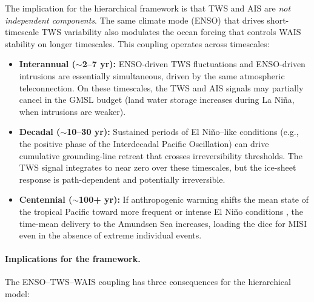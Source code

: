 \documentclass[11pt]{article}
\newcommand{\CDW}{\text{CDW}}
\begin{document}
The implication for the hierarchical framework is that TWS and AIS are \emph{not independent components}.  The same climate mode (ENSO) that drives short-timescale TWS variability also modulates the ocean forcing that controls WAIS stability on longer timescales.  This coupling operates across timescales:

\begin{itemize}
  \item \textbf{Interannual ($\sim$2--7 yr):} ENSO-driven TWS fluctuations and ENSO-driven \CDW{} intrusions are essentially simultaneous, driven by the same atmospheric teleconnection.  On these timescales, the TWS and AIS signals may partially cancel in the GMSL budget (land water storage increases during La Ni\~na, when \CDW{} intrusions are weaker).

  \item \textbf{Decadal ($\sim$10--30 yr):} Sustained periods of El Ni\~no--like conditions (e.g., the positive phase of the Interdecadal Pacific Oscillation) can drive cumulative grounding-line retreat that crosses irreversibility thresholds.  The TWS signal integrates to near zero over these timescales, but the ice-sheet response is path-dependent and potentially irreversible.

  \item \textbf{Centennial ($\sim$100+ yr):} If anthropogenic warming shifts the mean state of the tropical Pacific toward more frequent or intense El Ni\~no conditions \citep{cai2014increasing}, the time-mean \CDW{} delivery to the Amundsen Sea increases, loading the dice for MISI even in the absence of extreme individual events.
\end{itemize}

\paragraph{Implications for the framework.}

The ENSO--TWS--WAIS coupling has three consequences for the hierarchical model:
\end{document}
